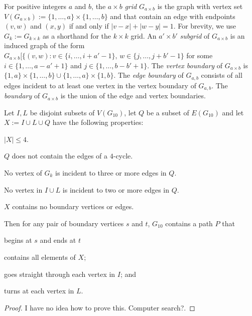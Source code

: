 \documentclass{patmorin}
\begin{document}
For positive integers $a$ and $b$, the $a\times b$ \emph{grid} $G_{a\times b}$ is the graph with vertex set $V(G_{a\times b}):=\{1,\ldots,a\}\times\{1,\ldots,b\}$ and that contain an edge with endpoints $(v,w)$ and $(x,y)$ if and only if $|v-x|+|w-y|=1$. For brevity, we use $G_{k}:=G_{k\times k}$ as a shorthand for the $k\times k$ grid.  An $a'\times b'$ \emph{subgrid} of $G_{a\times b}$ is an induced graph of the form $G_{a\times b}[\{(v,w): v\in\{i,\ldots,i+a'-1\},\, w\in\{j,\ldots,j+b'-1\}$ for some $i\in\{1,\ldots,a-a'+1\}$ and $j\in\{1,\ldots,b-b'+1\}$.   The \emph{vertex boundary} of $G_{a\times b}$ is $\{1,a\}\times\{1,\ldots,b\}\cup \{1,\ldots,a\}\times\{1,b\}$.  The \emph{edge boundary} of $G_{a,b}$ consists of all edges incident to at least one vertex in the vertex boundary of $G_{a,b}$. The \emph{boundary} of $G_{a\times b}$ is the union of the edge and vertex boundaries.


\begin{lem}
  Let $I,L$ be disjoint subsets of $V(G_{10})$, let $Q$ be a subset of $E(G_{10})$ and let $X:=I\cup L\cup Q$ have the following properties:
  \begin{compactenum}[(Pr1)]\setcounter{enumi}{0}
    \item $|X|\le 4$.
    \item $Q$ does not contain the edges of a $4$-cycle.
    \item No vertex of $G_k$ is incident to three or more edges in $Q$.
    \item No vertex in $I\cup L$ is incident to two or more edges in $Q$.
    \item $X$ contains no boundary vertices or edges.
  \end{compactenum}
  Then for any pair of boundary vertices $s$ and $t$, $G_{10}$ contains a path $P$ that 
  \begin{compactenum}
    \item begins at $s$ and ends at $t$
    \item contains all elements of $X$;
    \item goes straight through each vertex in $I$; and
    \item turns at each vertex in $L$.
  \end{compactenum}
\end{lem}

\begin{proof}
  I have no idea how to prove this.  Computer search?.  
\end{proof}
\end{document}
